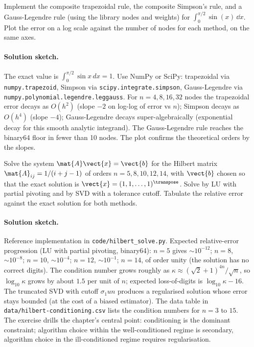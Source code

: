 \begin{exercise}
Implement the composite trapezoidal rule, the composite Simpson's
rule, and a Gauss-Legendre rule (using the library nodes and
weights) for $\int_{0}^{\pi/2} \sin(x)\, \dd x$. Plot the error
on a log scale against the number of nodes for each method, on
the same axes.
\end{exercise}

\paragraph{Solution sketch.}
The exact value is $\int_{0}^{\pi/2} \sin x\, dx = 1$. Use
NumPy or SciPy: trapezoidal via \texttt{numpy.trapezoid},
Simpson via \texttt{scipy.integrate.simpson}, Gauss-Legendre via
\texttt{numpy.polynomial.legendre.leggauss}. For $n = 4, 8, 16, 32$
nodes the trapezoidal error decays as $O(h^{2})$ (slope $-2$ on
log-log of error vs $n$); Simpson decays as $O(h^{4})$ (slope $-4$);
Gauss-Legendre decays super-algebraically (exponential decay for
this smooth analytic integrand). The Gauss-Legendre rule reaches
the binary64 floor in fewer than 10 nodes. The plot confirms the
theoretical orders by the slopes.

\begin{exercise}
Solve the system $\mat{A}\vect{x} = \vect{b}$ for the Hilbert
matrix $\mat{A}_{ij} = 1/(i + j - 1)$ of orders $n = 5, 8, 10,
12, 14$, with $\vect{b}$ chosen so that the exact solution is
$\vect{x} = (1, 1, \ldots, 1)^{\transpose}$. Solve by LU with
partial pivoting and by SVD with a tolerance cutoff. Tabulate the
relative error against the exact solution for both methods.
\end{exercise}

\paragraph{Solution sketch.}
Reference implementation in \texttt{code/hilbert\_solve.py}.
Expected relative-error progression (LU with partial pivoting,
binary64): $n = 5$ gives $\sim 10^{-12}$; $n = 8$, $\sim 10^{-8}$;
$n = 10$, $\sim 10^{-4}$; $n = 12$, $\sim 10^{-1}$; $n = 14$, of
order unity (the solution has no correct digits). The condition
number grows roughly as $\kappa \approx (\sqrt{2} + 1)^{4n}/\sqrt{n}$,
so $\log_{10}\kappa$ grows by about $1.5$ per unit of $n$;
expected loss-of-digits is $\log_{10}\kappa - 16$. The truncated
SVD with cutoff $\sigma_{1} u n$ produces a regularised solution
whose error stays bounded (at the cost of a biased estimator).
The data table in \texttt{data/hilbert-conditioning.csv} lists the
condition numbers for $n = 3$ to $15$. The exercise drills the
chapter's central point: conditioning is the dominant constraint;
algorithm choice within the well-conditioned regime is secondary,
algorithm choice in the ill-conditioned regime requires
regularisation.

